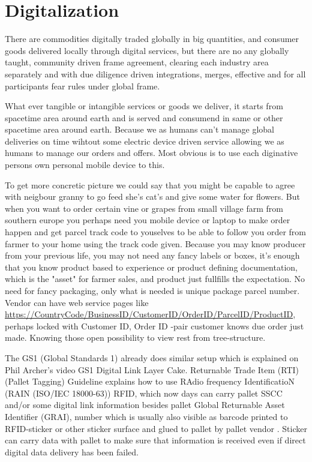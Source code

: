 \section{Digitalization}
\label{digitalization}
There are commodities digitally traded globally in big quantities, and consumer
goods delivered locally through digital services, but there are no any globally
taught, community driven frame agreement, clearing each industry area separately
and with due diligence driven integrations, merges, effective and for all
participants fear rules under global frame.

What ever tangible or intangible services or goods we deliver, it starts from
spacetime area around earth and is served and consumend in same or other
spacetime area around earth. Because we as humans can't manage global deliveries
on time wihtout some electric device driven service allowing we as humans to
manage our orders and offers. Most obvious is to use each diginative persons
own personal mobile device to this.

To get more concretic picture we could say that you might be capable to agree
with neigbour granny to go feed she's cat's and give some water for flowers.
But when you want to order certain vine or grapes from small village farm from
southern europe you perhaps need you mobile device or laptop to make order
happen and get parcel track code to youselves to be able to follow you order
from farmer to your home using the track code given. Because you may know
producer from your previous life, you may not need any fancy labels or boxes,
it's enough that you know product based to experience or product defining
documentation, which is the "asset" for farmer sales, and product just
fullfills the expectation. No need for fancy packaging, only what is needed is
unique package parcel number. Vendor can have web service pages like
\url{https://CountryCode/BusinessID/CustomerID/OrderID/ParcelID/ProductID},
perhaps locked with Customer ID, Order ID -pair customer knows due order
just made. Knowing those open possibility to view rest from tree-structure.

The GS1 (Global Standards 1) already does similar setup which is explained on
Phil Archer's video GS1 Digital Link Layer Cake\cite{GS1DigitalLink}.
Returnable Trade Item (RTI) (Pallet Tagging) Guideline\cite{RTIguideline}
explains how to use RAdio frequency IdentificatioN (RAIN (ISO/IEC 18000-63))
RFID\cite{UHFforRAIN}, which now days can carry pallet SSCC and/or some digital
link information besides pallet Global Returnable Asset Identifier (GRAI),
number which is usually also visible as barcode printed to RFID-sticker
or other sticker surface and glued to pallet by pallet vendor
\cite{EPalIPal}\cite{AllGreenPallets}\cite{iGpsRFID}\cite{SRSpallets}\cite{CramerRFIDoption}\cite{ChepIcoQube}.
Sticker can carry data with pallet to make sure that information
is received even if direct digital data delivery has been failed.

